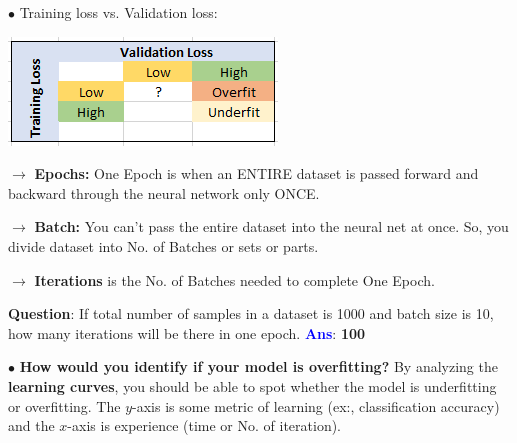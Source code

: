 \documentclass[letterpaper, 10.5pt,landscape]{article}
\begin{document}
\begin{multicols*}{3}
$\bullet$ Training loss vs. Validation loss:
\vspace{-3pt}
\begin{center}
    \begin{minipage}{0.60\linewidth}
        \includegraphics[width=\textwidth]{figures/Training_Validation_Loss.PNG}
    \end{minipage}
\end{center}

\vspace{-3pt}

$\rightarrow$ \textbf{Epochs:} One Epoch is when an ENTIRE dataset is passed forward and backward through the neural network only ONCE.

$\rightarrow$ \textbf{Batch:} You can’t pass the entire dataset into the neural net at once. So, you divide dataset into No. of Batches or sets or parts.

$\rightarrow$ \textbf{Iterations} is the No. of Batches needed to complete One Epoch.

\textbf{Question}: If total number of samples in a dataset is 1000 and batch size is 10, how many iterations will be there in one epoch. \textbf{\textcolor{blue}{Ans}}: \textbf{100}

\vspace{3pt}
$\bullet$ \textbf{How would you identify if your model is overfitting?}
By analyzing the \textbf{learning curves}, you should be able to spot whether the model is underfitting or overfitting. The $y$-axis is some metric of learning (ex:, classification accuracy) and the $x$-axis is experience (time or No. of iteration).



\end{multicols*}
\end{document}

